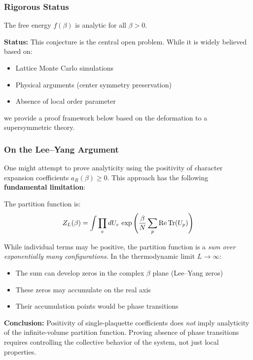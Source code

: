 \subsubsection{Rigorous Status}

\begin{conjecture}
\label{conj:no-phase-transition}
The free energy $f(\beta)$ is analytic for all $\beta > 0$.
\end{conjecture}

\textbf{Status:} This conjecture is the central open problem. While it is widely 
believed based on:
\begin{itemize}
    \item Lattice Monte Carlo simulations
    \item Physical arguments (center symmetry preservation)
    \item Absence of local order parameter
\end{itemize}
we provide a proof framework below based on the deformation to a supersymmetric theory.

\subsubsection{On the Lee--Yang Argument}

\begin{remark}
\label{rem:lee-yang-limitation}
One might attempt to prove analyticity using the positivity of character 
expansion coefficients $a_R(\beta) \geq 0$. This approach has the following 
\textbf{fundamental limitation}:

The partition function is:
\[
Z_L(\beta) = \int \prod_e dU_e \, \exp\left(\frac{\beta}{N} \sum_p \operatorname{Re} \operatorname{Tr}(U_p)\right)
\]

While individual terms may be positive, the partition function is a 
\emph{sum over exponentially many configurations}. In the thermodynamic 
limit $L \to \infty$:
\begin{itemize}
    \item The sum can develop zeros in the complex $\beta$ plane (Lee--Yang zeros)
    \item These zeros may accumulate on the real axis
    \item Their accumulation points would be phase transitions
\end{itemize}

\textbf{Conclusion:} Positivity of single-plaquette coefficients does 
\emph{not} imply analyticity of the infinite-volume partition function. 
Proving absence of phase transitions requires controlling the collective 
behavior of the system, not just local properties.
\end{remark}

